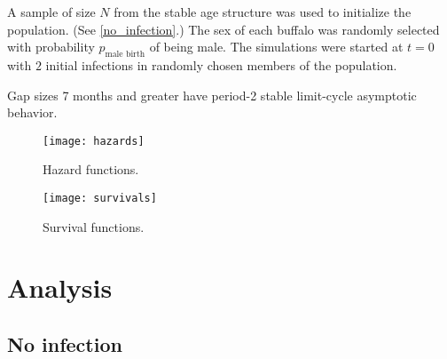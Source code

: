 \documentclass{jpmarticle}
\begin{document}
A sample of size $N$ from the stable age structure was used to
initialize the population.  (See \autoref{no_infection}.)  The sex of
each buffalo was randomly selected with probability
$p_{\text{male birth}}$ of being male.  The simulations were started
at $t = 0$ with $2$ initial infections in randomly chosen members of
the population.

Gap sizes 7 months and greater have period-2 stable limit-cycle
asymptotic behavior.


\begin{figure}
  \centering
  \texttt{[image: hazards]}
  \caption{Hazard functions.}
  \label{fig:hazard}
\end{figure}


\begin{figure}
  \centering
  \texttt{[image: survivals]}
  \caption{Survival functions.}
  \label{fig:survival}
\end{figure}



\clearpage
\section{Analysis}

\subsection{No infection}
\label{no_infection}
\end{document}
